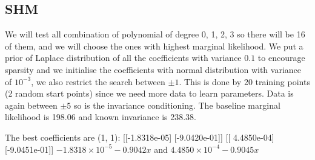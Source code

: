 \documentclass{statsmsc}
\begin{document}
\subsection{SHM}
We will test all combination of polynomial of degree 0, 1, 2, 3 so there will be 16 of them, and we will choose the ones with highest marginal likelihood.
We put a prior of Laplace distribution of all the coefficients with variance $0.1$ to encourage sparsity and we initialise the coefficients with normal distribution with variance of $10^{-3}$, we also restrict the search between $\pm 1$.
This is done by 20 training points (2 random start points) since we need more data to learn parameters.
Data is again between $\pm 5$ so is the invariance conditioning.
The baseline marginal likelihood is 198.06 and known invariance is 238.38.
\begin{flushleft}
\begin{table}[H]
  \caption{Log marginal likelihood for polynomial of different degree}
  \label{tab:shm_paramertised}
\end{table}
\end{flushleft}
The best coefficients are (1, 1):
[[-1.8318e-05]
 [-9.0420e-01]]
[[ 4.4850e-04]
 [-9.0451e-01]]
$-1.8318\times 10^{-5}-0.9042x$
and
$4.4850\times 10^{-4}-0.9045x$
\end{document}
